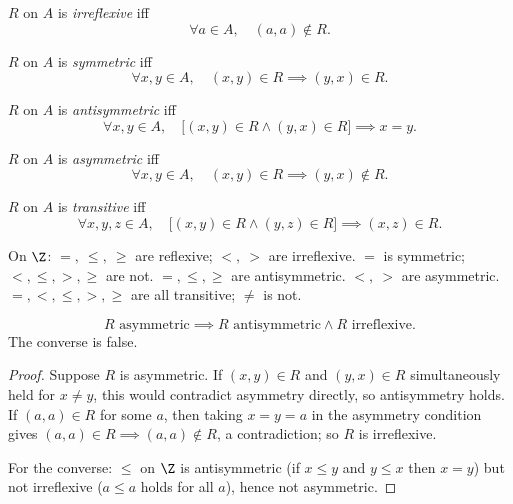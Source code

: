 \begin{definition}[Irreflexive]
$R$ on $A$ is \emph{irreflexive} iff
\[
\forall a \in A,\quad (a,a) \notin R.
\]
\end{definition}

\begin{definition}[Symmetric]
$R$ on $A$ is \emph{symmetric} iff
\[
\forall x,y \in A,\quad (x,y) \in R \implies (y,x) \in R.
\]
\end{definition}

\begin{definition}[Antisymmetric]
$R$ on $A$ is \emph{antisymmetric} iff
\[
\forall x,y \in A,\quad \big[(x,y) \in R \wedge (y,x) \in R\big] \implies x = y.
\]
\end{definition}

\begin{definition}[Asymmetric]
$R$ on $A$ is \emph{asymmetric} iff
\[
\forall x,y \in A,\quad (x,y) \in R \implies (y,x) \notin R.
\]
\end{definition}

\begin{definition}[Transitive]
$R$ on $A$ is \emph{transitive} iff
\[
\forall x,y,z \in A,\quad \big[(x,y) \in R \wedge (y,z) \in R\big] \implies (x,z) \in R.
\]
\end{definition}

\begin{example}
On $\Z$: $=,\ \le,\ \ge$ are reflexive; $<,\ >$ are irreflexive. $=$ is symmetric; $<,\le,>,\ge$ are not. $=,\le,\ge$ are antisymmetric. $<,\ >$ are asymmetric. $=,<,\le,>,\ge$ are all transitive; $\neq$ is not.
\end{example}

\begin{proposition}
\[
R \text{ asymmetric} \implies R \text{ antisymmetric} \wedge R \text{ irreflexive}.
\]
The converse is false.
\end{proposition}
\begin{proof}
Suppose $R$ is asymmetric. If $(x,y) \in R$ and $(y,x) \in R$ simultaneously held for $x \neq y$, this would contradict asymmetry directly, so antisymmetry holds. If $(a,a) \in R$ for some $a$, then taking $x=y=a$ in the asymmetry condition gives $(a,a) \in R \implies (a,a) \notin R$, a contradiction; so $R$ is irreflexive.

For the converse: $\le$ on $\Z$ is antisymmetric (if $x\le y$ and $y\le x$ then $x=y$) but not irreflexive ($a \le a$ holds for all $a$), hence not asymmetric.
\end{proof}

